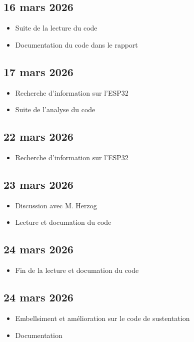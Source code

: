 \subsection*{16 mars 2026}
\begin{itemize}
    \item Suite de la lecture du code
    \item Documentation du code dans le rapport
\end{itemize}

\subsection*{17 mars 2026}
\begin{itemize}
    \item Recherche d'information sur l'ESP32
    \item Suite de l'analyse du code
\end{itemize}

\subsection*{22 mars 2026}
\begin{itemize}
    \item Recherche d'information sur l'ESP32
\end{itemize}

\subsection*{23 mars 2026}
\begin{itemize}
    \item Discussion avec M. Herzog
    \item Lecture et documation du code
\end{itemize}

\subsection*{24 mars 2026}
\begin{itemize}
    \item Fin de la lecture et documation du code
\end{itemize}

\subsection*{24 mars 2026}
\begin{itemize}
    \item Embellsiment et amélioration sur le code de sustentation
    \item Documentation
\end{itemize}


